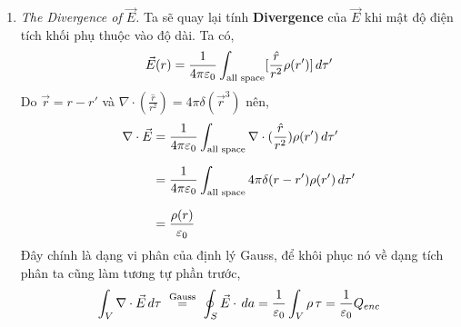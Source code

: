\begin{enumerate}
\textbf{Chú ý !!} Ta ký hiệu gốc cực và gốc phương vị này hơi khác so với định nghĩa tọa độ cầu ở trên, với \textbf{góc cực} là $\phi$ còn \textbf{góc phương vị} là $\theta$.

\item \textit{The Divergence of $\vec{E}$.}
Ta sẽ quay lại tính \textbf{Divergence} của $\vec{E}$ khi mật độ điện tích khối phụ thuộc vào độ dài. Ta có,
\[
\vec{E}(r) = \frac{1}{4 \pi \varepsilon_{0}} \int_{\text{all space}} [\frac{\hat{r}}{r^2}\rho(r')] \, d\tau'
\]
Do $\vec{r} = r - r'$ và $\nabla \cdot (\frac{\hat{r}}{r^2}) = 4\pi\delta(\vec{r}^3)$ nên,
\begin{align*}
\nabla \cdot \vec{E} &= \frac{1}{4 \pi \varepsilon_{0}} \int_{\text{all space}} \nabla \cdot (\frac{\hat{r}}{r^2})\rho(r') \, d\tau'\\[6pt]
&=  \frac{1}{4 \pi \varepsilon_{0}} \int_{\text{all space}} 4\pi \delta(r - r') \rho(r') \, d\tau'\\[6pt]
&= \frac{\rho(r)}{\varepsilon_{0}}
\end{align*}
Đây chính là dạng vi phân của định lý Gauss, để khôi phục nó về dạng tích phân ta cũng làm tương tự phần trước,
\[
\int_{V} \nabla \cdot \vec{E} \, d \tau \,\, \overset{\text{Gauss}}{=} \,\, \oint_{S} \vec{E} \cdot \, da = \frac{1}{\varepsilon_{0}}\int_{V} \rho \, \tau = \frac{1}{\varepsilon_{0}} Q_{enc}
\]




\end{enumerate}
